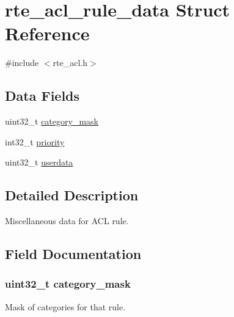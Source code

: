 \hypertarget{structrte__acl__rule__data}{}\section{rte\+\_\+acl\+\_\+rule\+\_\+data Struct Reference}
\label{structrte__acl__rule__data}


{\ttfamily \#include $<$rte\+\_\+acl.\+h$>$}

\subsection*{Data Fields}
\begin{DoxyCompactItemize}
\item 
uint32\+\_\+t \hyperlink{structrte__acl__rule__data_a8e04443d6df4f72f606e82f67be0581a}{category\+\_\+mask}
\item 
int32\+\_\+t \hyperlink{structrte__acl__rule__data_a41b7c4ba47c44a632d5903b1f1338ad0}{priority}
\item 
uint32\+\_\+t \hyperlink{structrte__acl__rule__data_a5ebe574f1b536f72c61731511ca74ef5}{userdata}
\end{DoxyCompactItemize}


\subsection{Detailed Description}
Miscellaneous data for A\+C\+L rule. 

\subsection{Field Documentation}
\hypertarget{structrte__acl__rule__data_a8e04443d6df4f72f606e82f67be0581a}{}
\subsubsection[{category\+\_\+mask}]{\setlength{\rightskip}{0pt plus 5cm}uint32\+\_\+t category\+\_\+mask}\label{structrte__acl__rule__data_a8e04443d6df4f72f606e82f67be0581a}
Mask of categories for that rule. \hypertarget{structrte__acl__rule__data_a41b7c4ba47c44a632d5903b1f1338ad0}{}
